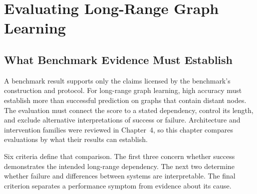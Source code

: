 \chapter{Evaluating Long-Range Graph Learning}
\label{chap:state-of-the-art}

\section{What Benchmark Evidence Must Establish}

A benchmark result supports only the claims licensed by the benchmark's construction and protocol.
For long-range graph learning, high accuracy must establish more than successful prediction on graphs that contain distant nodes.
The evaluation must connect the score to a stated dependency, control its length, and exclude alternative interpretations of success or failure.
Architecture and intervention families were reviewed in Chapter~4, so this chapter compares evaluations by what their results can establish.

Six criteria define that comparison.
The first three concern whether success demonstrates the intended long-range dependency.
The next two determine whether failure and differences between systems are interpretable.
The final criterion separates a performance symptom from evidence about its cause.

